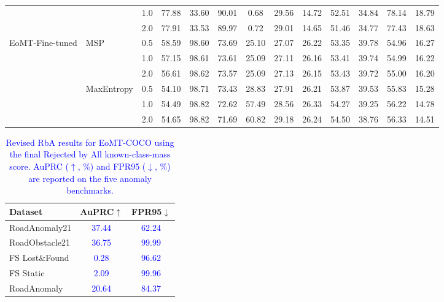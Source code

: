 \begin{table}[!htbp]
{\begin{tabular}{llc|cc|cc|cc|cc|cc}
                &            & 1.0 & 77.88 & 33.60 & 90.01 & 0.68  & 29.56 & 14.72 & 52.51 & 34.84 & 78.14 & 18.79 \\
                &            & 2.0 & 77.91 & 33.53 & 89.97 & 0.72  & 29.01 & 14.65 & 51.46 & 34.77 & 77.43 & 18.63 \\
\midrule
EoMT-Fine-tuned & MSP        & 0.5 & 58.59 & 98.60 & 73.69 & 25.10 & 27.07 & 26.22 & 53.35 & 39.78 & 54.96 & 16.27 \\
                &            & 1.0 & 57.15 & 98.61 & 73.61 & 25.09 & 27.11 & 26.16 & 53.41 & 39.74 & 54.99 & 16.22 \\
                &            & 2.0 & 56.61 & 98.62 & 73.57 & 25.09 & 27.13 & 26.15 & 53.43 & 39.72 & 55.00 & 16.20 \\
                & MaxEntropy & 0.5 & 54.10 & 98.71 & 73.43 & 28.83 & 27.91 & 26.21 & 53.87 & 39.53 & 55.83 & 15.28 \\
                &            & 1.0 & 54.49 & 98.82 & 72.62 & 57.49 & 28.56 & 26.33 & 54.27 & 39.25 & 56.22 & 14.78 \\
                &            & 2.0 & 54.65 & 98.82 & 71.69 & 60.82 & 29.18 & 26.24 & 54.50 & 38.76 & 56.33 & 14.51 \\
\bottomrule
\end{tabular}}
\end{table}
\begin{table}[!htbp]
\centering
\small
\caption{\textcolor{blue}{Revised RbA results for EoMT-COCO using the final Rejected by All known-class-mass score. AuPRC ($\uparrow$, \%) and FPR95 ($\downarrow$, \%) are reported on the five anomaly benchmarks.}}
\label{tab:rba_revised_coco}
\begin{tabular}{lcc}
\toprule
Dataset & AuPRC$\uparrow$ & FPR95$\downarrow$ \\
\midrule
RoadAnomaly21        & \textcolor{blue}{37.44} & \textcolor{blue}{62.24} \\
RoadObstacle21       & \textcolor{blue}{36.75} & \textcolor{blue}{99.99} \\
FS Lost\&Found       & \textcolor{blue}{0.28}  & \textcolor{blue}{96.62} \\
FS Static            & \textcolor{blue}{2.09}  & \textcolor{blue}{99.96} \\
RoadAnomaly          & \textcolor{blue}{20.64} & \textcolor{blue}{84.37} \\
\bottomrule
\end{tabular}
\end{table}
